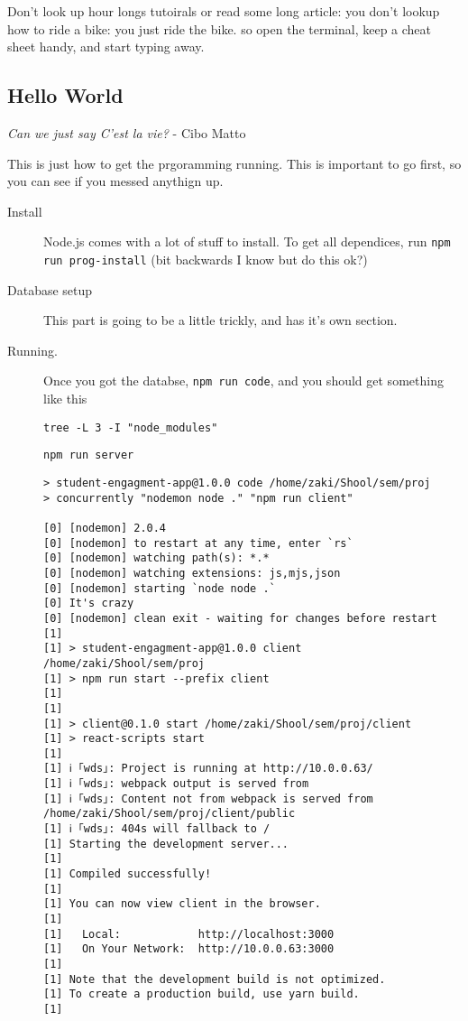 \documentclass[11pt]{article}
\begin{document}
Don't look up hour longs tutoirals or read some long article: you don't lookup how to ride a bike: you just ride the bike. so open the terminal, keep a cheat sheet handy, and start typing away.


\subsection*{Hello World}
\label{sec:orgdf4f6b3}
\begin{center}
\emph{Can we just say C'est la vie?} - Cibo Matto
\end{center}
This is just how to get the prgoramming running. This is important to go first, so you can see if you messed anythign up.

\begin{description}
\item[{Install}] Node.js comes with a lot of stuff to install. To get all dependices, run \texttt{npm run prog-install} (bit backwards I know but do this ok?)
\item[{Database setup}] This part is going to be a little trickly, and has it's own section.
\item[{Running.}] Once you got the databse, \texttt{npm run code}, and you should get something like this
\begin{verbatim}
tree -L 3 -I "node_modules"
\end{verbatim}
\texttt{npm run server}

\begin{verbatim}
> student-engagment-app@1.0.0 code /home/zaki/Shool/sem/proj
> concurrently "nodemon node ." "npm run client"

[0] [nodemon] 2.0.4
[0] [nodemon] to restart at any time, enter `rs`
[0] [nodemon] watching path(s): *.*
[0] [nodemon] watching extensions: js,mjs,json
[0] [nodemon] starting `node node .`
[0] It's crazy
[0] [nodemon] clean exit - waiting for changes before restart
[1] 
[1] > student-engagment-app@1.0.0 client /home/zaki/Shool/sem/proj
[1] > npm run start --prefix client
[1] 
[1] 
[1] > client@0.1.0 start /home/zaki/Shool/sem/proj/client
[1] > react-scripts start
[1] 
[1] ℹ ｢wds｣: Project is running at http://10.0.0.63/
[1] ℹ ｢wds｣: webpack output is served from 
[1] ℹ ｢wds｣: Content not from webpack is served from /home/zaki/Shool/sem/proj/client/public
[1] ℹ ｢wds｣: 404s will fallback to /
[1] Starting the development server...
[1] 
[1] Compiled successfully!
[1] 
[1] You can now view client in the browser.
[1] 
[1]   Local:            http://localhost:3000
[1]   On Your Network:  http://10.0.0.63:3000
[1] 
[1] Note that the development build is not optimized.
[1] To create a production build, use yarn build.
[1] 
\end{verbatim}
\end{description}
\end{document}
